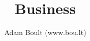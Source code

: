 \documentclass[oneside]{book}
\begin{document}
\author{Adam Boult (www.bou.lt)}
\title{Business}
\maketitle

\setcounter{tocdepth}{0}
\tableofcontents


\end{document}
